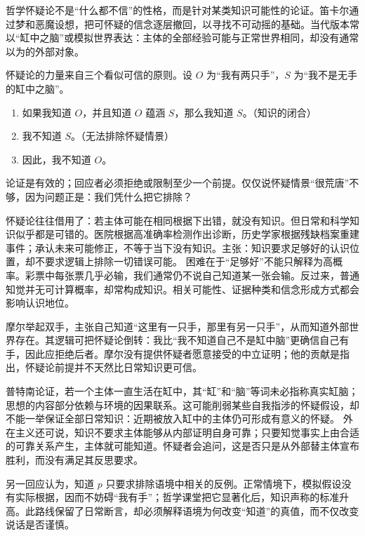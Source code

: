 哲学怀疑论不是“什么都不信”的性格，而是针对某类知识可能性的论证。笛卡尔通过梦和恶魔设想，把可怀疑的信念逐层撤回，以寻找不可动摇的基础\parencite{descartes1996}。当代版本常以“缸中之脑”或模拟世界表达：主体的全部经验可能与正常世界相同，却没有通常以为的外部对象。

怀疑论的力量来自三个看似可信的原则。设 $O$ 为“我有两只手”，$S$ 为“我不是无手的缸中之脑”。
\begin{argumentbox}
\begin{enumerate}
  \item 如果我知道 $O$，并且知道 $O$ 蕴涵 $S$，那么我知道 $S$。（知识的闭合）
  \item 我不知道 $S$。（无法排除怀疑情景）
  \item 因此，我不知道 $O$。
\end{enumerate}
\end{argumentbox}
论证是有效的；回应者必须拒绝或限制至少一个前提。仅仅说怀疑情景“很荒唐”不够，因为问题正是：我们凭什么把它排除？

怀疑论往往借用了：若主体可能在相同根据下出错，就没有知识。但日常和科学知识似乎都是可错的。医院根据高准确率检测作出诊断，历史学家根据残缺档案重建事件；承认未来可能修正，不等于当下没有知识。主张：知识要求足够好的认识位置，却不要求逻辑上排除一切错误可能。 困难在于“足够好”不能只解释为高概率。彩票中每张票几乎必输，我们通常仍不说自己知道某一张会输。反过来，普通知觉并无可计算概率，却常构成知识。相关可能性、证据种类和信念形成方式都会影响认识地位。

摩尔举起双手，主张自己知道“这里有一只手，那里有另一只手”，从而知道外部世界存在\parencite[144--145]{moore1959}。其逻辑可把怀疑论倒转：我比“我不知道自己不是缸中脑”更确信自己有手，因此应拒绝后者。摩尔没有提供怀疑者愿意接受的中立证明；他的贡献是指出，怀疑论前提并不天然比日常知识更可信。

普特南论证，若一个主体一直生活在缸中，其“缸”和“脑”等词未必指称真实缸脑；思想的内容部分依赖与环境的因果联系\parencite{putnam1981}。这可能削弱某些自我指涉的怀疑假设，却不能一举保证全部日常知识：近期被放入缸中的主体仍可形成有意义的怀疑。 外在主义还可说，知识不要求主体能够从内部证明自身可靠；只要知觉事实上由合适的可靠关系产生，主体就可能知道。怀疑者会追问，这是否只是从外部替主体宣布胜利，而没有满足其反思要求。

另一回应认为，知道 $p$ 只要求排除语境中相关的反例。正常情境下，模拟假设没有实际根据，因而不妨碍“我有手”；哲学课堂把它显著化后，知识声称的标准升高。此路线保留了日常断言，却必须解释语境为何改变“知道”的真值，而不仅改变说话是否谨慎。

